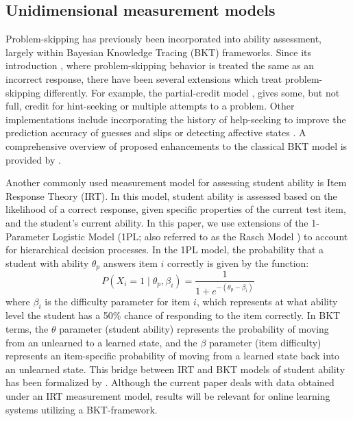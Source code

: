 \documentclass{edm_article}
\begin{document}
\subsection{Unidimensional measurement models}
Problem-skipping has previously been incorporated into ability assessment, largely within Bayesian Knowledge Tracing (BKT) frameworks. Since its introduction \cite{corbett1995knowledge}, where problem-skipping behavior is treated the same as an incorrect response, there have been several extensions which treat problem-skipping differently. For example, the partial-credit model \cite{wang2010representing, wang2013extending, ostrow2015improving}, gives some, but not full, credit for hint-seeking or multiple attempts to a problem. Other implementations include incorporating the history of help-seeking to improve the prediction accuracy of guesses and slips \cite{baker2008more} or detecting affective states \cite{corrigan2015dynamic}. A comprehensive overview of proposed enhancements to the classical BKT model is provided by \cite{saric-grgic2024twenty-five}. 

Another commonly used measurement model for assessing student ability is Item Response Theory (IRT). In this model, student ability is assessed based on the likelihood of a correct response, given specific properties of the current test item, and the student's current ability. In this paper, we use extensions of the 1-Parameter Logistic Model (1PL; also referred to as the Rasch Model \cite{rasch1993probabilistic}) to account for hierarchical decision processes. In the 1PL model, the probability that a student with ability $\theta_p$ answers item $i$ correctly is given by the function: 
\begin{equation}
  P(X_i = 1 \mid \theta_p, \beta_i) = \frac{1}{1 + e^{-(\theta_p - \beta_i)}}
  \label{eq:Rasch}
\end{equation}
where $\beta_i$ is the difficulty parameter for item $i$, which represents at what ability level the student has a 50\% chance of responding to the item correctly. In BKT terms, the $\theta$ parameter (student ability) represents the probability of moving from an unlearned to a learned state, and the $\beta$ parameter (item difficulty) represents an item-specific probability of moving from a learned state back into an unlearned state. This bridge between IRT and BKT models of student ability has been formalized by \cite{deonovic2018learning}. Although the current paper deals with data obtained under an IRT measurement model, results will be relevant for online learning systems utilizing a BKT-framework. 
\end{document}
